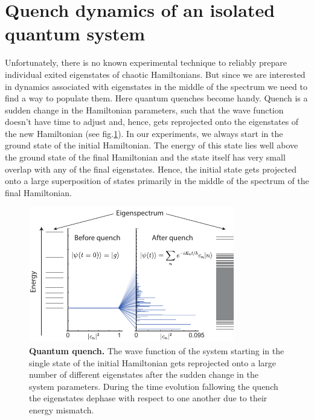 \section{Quench dynamics of an isolated quantum system}

Unfortunately, there is no known experimental technique to reliably prepare individual exited eigenstates of chaotic Hamiltonians. But since we are interested in dynamics associated with eigenstates in the middle of the spectrum we need to find a way to populate them. Here quantum quenches become handy. Quench is a sudden change in the Hamiltonian parameters, such that the wave function doesn't have time to adjust and, hence, gets reprojected onto the eigenstates of the new Hamiltonian (see fig.\ref{fig:ETH_quench}). In our experiments, we always start in the ground state of the initial Hamiltonian. The energy of this state lies well above the ground state of the final Hamiltonian and the state itself has very small overlap with any of the final eigenstates. Hence, the initial state gets projected onto a large superposition of states primarily in the middle of the spectrum of the final Hamiltonian. 

\begin{figure}[t!]
	\centering
	\includegraphics[scale=1.5]{figures/ETH_quench.pdf}
	\caption{{\bf Quantum quench.} The wave function of the system starting in the single state of the initial Hamiltonian gets reprojected onto a large number of different eigenstates after the sudden change in the system parameters. During the time evolution fallowing the quench the eigenstates dephase with respect to one another due to their energy mismatch. }
	\label{fig:ETH_quench}
\end{figure}

